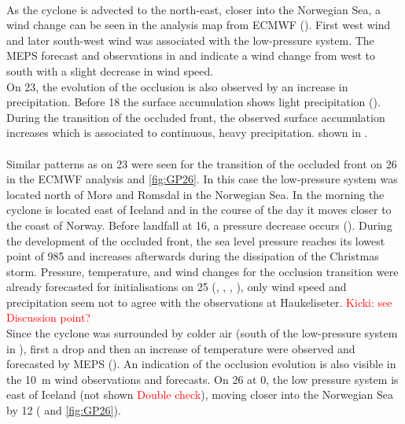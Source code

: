 \noindent
\\
As the cyclone is advected to the north-east, closer into the Norwegian Sea, a wind change can be seen in the analysis map from ECMWF (). First west wind and later south-west wind was associated with the low-pressure system. The MEPS forecast and observations in  and  indicate a wind change from west to south with a slight decrease in wind speed.
\\
On \SI{23}{\dec}, the evolution of the occlusion is also observed by an increase in precipitation. Before \SI{18}{\UTC} the surface accumulation shows light precipitation (). During the transition of the occluded front, the observed surface accumulation increases which is associated to continuous, heavy precipitation.  shown in .
\\
\\
Similar patterns as on \SI{23}{\dec} were seen for the transition of the occluded front on \SI{26}{\dec} in the ECMWF analysis  and \ref{fig:GP26}. In this case the low-pressure system was located north of Morø and Romsdal in the Norwegian Sea. In the morning the cyclone is located east of Iceland and in the course of the day it moves closer to the coast of Norway. Before landfall at \SI{16}{\UTC}, a pressure decrease occurs (). During the development of the occluded front, the sea level pressure reaches its lowest point of \SI{985}{\hPa} and increases afterwards during the dissipation of the Christmas storm. Pressure, temperature, and wind changes for the occlusion transition were already forecasted for initialisations on \SI{25}{\dec} (, , , ), only wind speed and precipitation seem not to agree with the observations at Haukeliseter. \textcolor{red}{Kicki: see Discussion point?}
\\
Since the cyclone was surrounded by colder air (south of the low-pressure system in ), first a drop and then an increase of temperature were observed and forecasted by MEPS (). An indication of the occlusion evolution is also visible in the \SI{10}{\metre} wind observations and forecasts. 
On \SI{26}{\dec} at \SI{0}{\UTC}, the low pressure system is east of Iceland (not shown \textcolor{red}{Double check}), moving closer into the Norwegian Sea by \SI{12}{\UTC} ( and \ref{fig:GP26}). 
